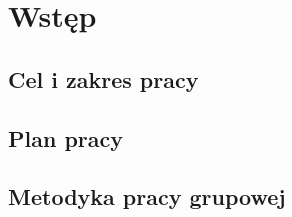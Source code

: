 \newpage\section{Wstęp}\label{sec:wstep}
 
\subsection{Cel i zakres pracy}

\subsection{Plan pracy}

\subsection{Metodyka pracy grupowej}

 
